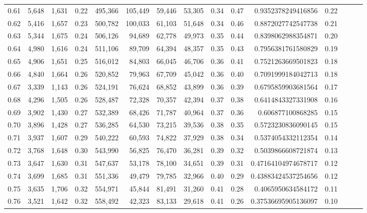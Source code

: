 \begin{tabular}{rrrrrrrrrrrrrrr}
0.61 &   5,648 &  1,631 &  0.22 &  495,366 &  105,449 &   59,446 &   53,305 &  0.34 &  0.47 &    0.9352378249416856 &      0.22 \\
0.62 &   5,416 &  1,657 &  0.23 &  500,782 &  100,033 &   61,103 &   51,648 &  0.34 &  0.46 &    0.8872027742547738 &      0.21 \\
0.63 &   5,344 &  1,675 &  0.24 &  506,126 &   94,689 &   62,778 &   49,973 &  0.35 &  0.44 &    0.8398062988354871 &      0.20 \\
0.64 &   4,980 &  1,616 &  0.24 &  511,106 &   89,709 &   64,394 &   48,357 &  0.35 &  0.43 &    0.7956381761580829 &      0.19 \\
0.65 &   4,906 &  1,651 &  0.25 &  516,012 &   84,803 &   66,045 &   46,706 &  0.36 &  0.41 &    0.7521263669501823 &      0.18 \\
0.66 &   4,840 &  1,664 &  0.26 &  520,852 &   79,963 &   67,709 &   45,042 &  0.36 &  0.40 &    0.7091999184042713 &      0.18 \\
0.67 &   3,339 &  1,143 &  0.26 &  524,191 &   76,624 &   68,852 &   43,899 &  0.36 &  0.39 &    0.6795859903681564 &      0.17 \\
0.68 &   4,296 &  1,505 &  0.26 &  528,487 &   72,328 &   70,357 &   42,394 &  0.37 &  0.38 &    0.6414843327331908 &      0.16 \\
0.69 &   3,902 &  1,430 &  0.27 &  532,389 &   68,426 &   71,787 &   40,964 &  0.37 &  0.36 &     0.606877100868285 &      0.15 \\
0.70 &   3,896 &  1,428 &  0.27 &  536,285 &   64,530 &   73,215 &   39,536 &  0.38 &  0.35 &    0.5723230836090145 &      0.15 \\
0.71 &   3,937 &  1,607 &  0.29 &  540,222 &   60,593 &   74,822 &   37,929 &  0.38 &  0.34 &    0.5374054332112354 &      0.14 \\
0.72 &   3,768 &  1,648 &  0.30 &  543,990 &   56,825 &   76,470 &   36,281 &  0.39 &  0.32 &    0.5039866608721874 &      0.13 \\
0.73 &   3,647 &  1,630 &  0.31 &  547,637 &   53,178 &   78,100 &   34,651 &  0.39 &  0.31 &   0.47164104974678717 &      0.12 \\
0.74 &   3,699 &  1,685 &  0.31 &  551,336 &   49,479 &   79,785 &   32,966 &  0.40 &  0.29 &   0.43883424537254656 &      0.12 \\
0.75 &   3,635 &  1,706 &  0.32 &  554,971 &   45,844 &   81,491 &   31,260 &  0.41 &  0.28 &    0.4065950634584172 &      0.11 \\
0.76 &   3,521 &  1,642 &  0.32 &  558,492 &   42,323 &   83,133 &   29,618 &  0.41 &  0.26 &   0.37536695905136097 &      0.10 \\

\end{tabular}
